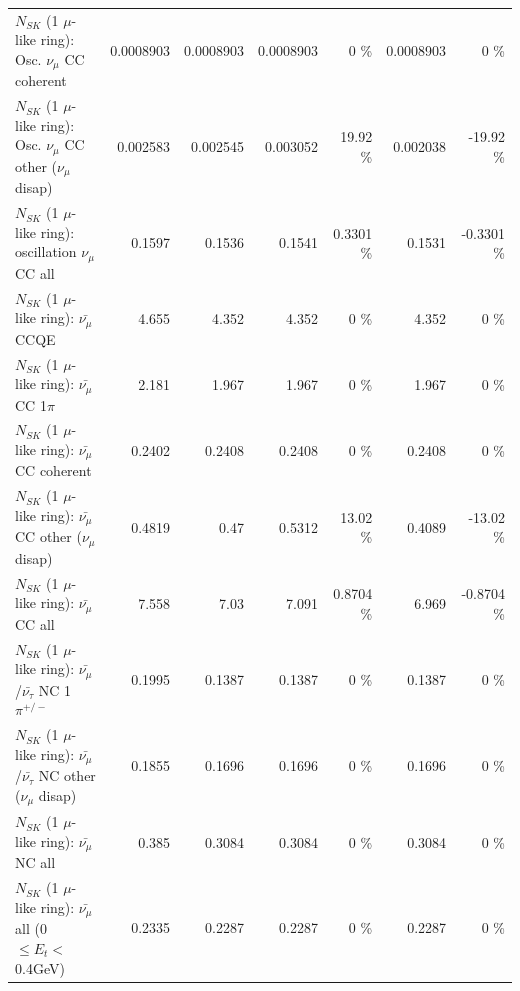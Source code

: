 \begin{table}
\begin{tabular}{| l | r | r | r  r | r  r |}
                        $N_{SK}$ (1 $\mu$-like ring): Osc. $\nu_\mu$ CC coherent &       0.0008903 &       0.0008903 &       0.0008903 &        0 \%  &       0.0008903 &        0 \%  \\ 
         $N_{SK}$ (1 $\mu$-like ring): Osc. $\nu_\mu$ CC other ($\nu_\mu$ disap) &        0.002583 &        0.002545 &        0.003052 &    19.92 \%  &        0.002038 &   -19.92 \%  \\ 
                      $N_{SK}$ (1 $\mu$-like ring): oscillation $\nu_\mu$ CC all &          0.1597 &          0.1536 &          0.1541 &   0.3301 \%  &          0.1531 &  -0.3301 \%  \\ 
\hline
\hline
                              $N_{SK}$ (1 $\mu$-like ring): $\bar{\nu_\mu}$ CCQE &           4.655 &           4.352 &           4.352 &        0 \%  &           4.352 &        0 \%  \\ 
                         $N_{SK}$ (1 $\mu$-like ring): $\bar{\nu_\mu}$ CC 1$\pi$ &           2.181 &           1.967 &           1.967 &        0 \%  &           1.967 &        0 \%  \\ 
                       $N_{SK}$ (1 $\mu$-like ring): $\bar{\nu_\mu}$ CC coherent &          0.2402 &          0.2408 &          0.2408 &        0 \%  &          0.2408 &        0 \%  \\ 
        $N_{SK}$ (1 $\mu$-like ring): $\bar{\nu_\mu}$ CC other ($\nu_\mu$ disap) &          0.4819 &            0.47 &          0.5312 &    13.02 \%  &          0.4089 &   -13.02 \%  \\ 
                          $N_{SK}$ (1 $\mu$-like ring): $\bar{\nu_{\mu}}$ CC all &           7.558 &            7.03 &           7.091 &   0.8704 \%  &           6.969 &  -0.8704 \%  \\ 
\hline
  $N_{SK}$ (1 $\mu$-like ring): $\bar{\nu_\mu}$/$\bar{\nu_\tau}$ NC 1$\pi^{+/-}$ &          0.1995 &          0.1387 &          0.1387 &        0 \%  &          0.1387 &        0 \%  \\ 
$N_{SK}$ (1 $\mu$-like ring): $\bar{\nu_\mu}$/$\bar{\nu_\tau}$ NC other ($\nu_\mu$ disap) &          0.1855 &          0.1696 &          0.1696 &        0 \%  &          0.1696 &        0 \%  \\ 
                          $N_{SK}$ (1 $\mu$-like ring): $\bar{\nu_{\mu}}$ NC all &           0.385 &          0.3084 &          0.3084 &        0 \%  &          0.3084 &        0 \%  \\ 
\hline
   $N_{SK}$ (1 $\mu$-like ring): $\bar{\nu_{\mu}}$ all (0 $\leq E_{t} <$ 0.4GeV) &          0.2335 &          0.2287 &          0.2287 &        0 \%  &          0.2287 &        0 \%  \\ 

\end{tabular}
\end{table}
